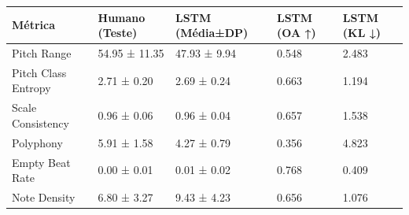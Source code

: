 \begin{tabular}{lllll}
\toprule
Métrica & Humano (Teste) & LSTM (Média±DP) & LSTM (OA ↑) & LSTM (KL ↓) \\
\midrule
Pitch Range & 54.95 ± 11.35 & 47.93 ± 9.94 & 0.548 & 2.483 \\
Pitch Class Entropy & 2.71 ± 0.20 & 2.69 ± 0.24 & 0.663 & 1.194 \\
Scale Consistency & 0.96 ± 0.06 & 0.96 ± 0.04 & 0.657 & 1.538 \\
Polyphony & 5.91 ± 1.58 & 4.27 ± 0.79 & 0.356 & 4.823 \\
Empty Beat Rate & 0.00 ± 0.01 & 0.01 ± 0.02 & 0.768 & 0.409 \\
Note Density & 6.80 ± 3.27 & 9.43 ± 4.23 & 0.656 & 1.076 \\
\bottomrule
\end{tabular}
